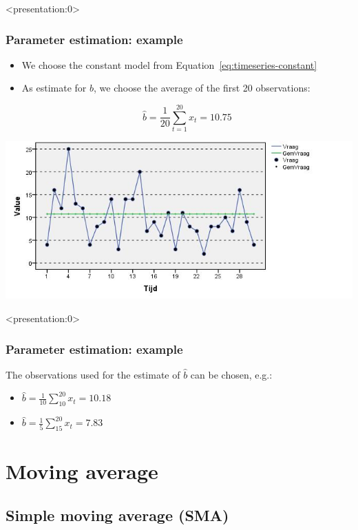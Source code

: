 \documentclass{beamer}
\begin{document}
\begin{frame}<presentation:0> %
  \frametitle{Parameter estimation: example}

  \begin{itemize}
    \item We choose the constant model from Equation~\ref{eq:timeseries-constant}
    \item As estimate for $b$, we choose the average of the first 20 observations:

      \[ \widehat{b} = \frac{1}{20} \sum_{t = 1}^{20} x_{t}= 10.75 \]

  \end{itemize}

  \centering
  \includegraphics[width=.7\textwidth]{img/tijdreeks21.jpg}
\end{frame}

\begin{frame}<presentation:0> %
  \frametitle{Parameter estimation: example}

  The observations used for the estimate of $\widehat{b}$ can be chosen, e.g.:

  \begin{itemize}
    \item $\widehat{b} = \frac{1}{10} \sum_{10}^{20} x_{t} = 10.18$
    \item $\widehat{b} = \frac{1}{5} \sum_{15}^{20} x_{t} = 7.83$
  \end{itemize}

\end{frame}

\section{Moving average}

\subsection{Simple moving average (SMA)}
\end{document}
